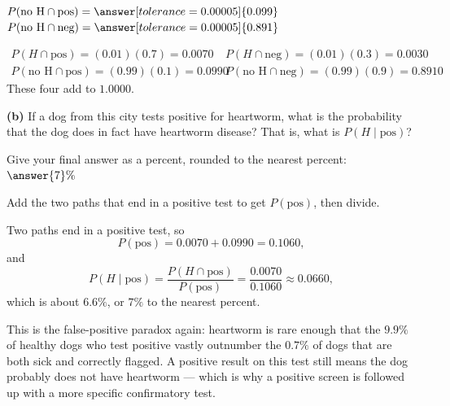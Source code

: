 \documentclass[12pt]{ximera}
\begin{document}
\begin{problem}
\begin{prompt}
\smallskip
$P(\text{no H}\cap\text{pos})=\answer[tolerance=0.00005]{0.099}$ \qquad
$P(\text{no H}\cap\text{neg})=\answer[tolerance=0.00005]{0.891}$

\begin{feedback}
\[
\begin{array}{ll}
P(H\cap\text{pos})=(0.01)(0.7)=0.0070 &
P(H\cap\text{neg})=(0.01)(0.3)=0.0030\\[2pt]
P(\text{no H}\cap\text{pos})=(0.99)(0.1)=0.0990 &
P(\text{no H}\cap\text{neg})=(0.99)(0.9)=0.8910
\end{array}
\]
These four add to $1.0000$. \checkmark
\end{feedback}
\end{prompt}

\begin{prompt}
\textbf{(b)} If a dog from this city tests positive for heartworm, what is the
probability that the dog does in fact have heartworm disease? That is, what is
$P(H\mid \text{pos})$?

Give your final answer as a percent, rounded to the nearest percent:
$\answer{7}\%$

\begin{hint}
Add the two paths that end in a positive test to get $P(\text{pos})$, then divide.
\end{hint}

\begin{feedback}
Two paths end in a positive test, so
\[
P(\text{pos}) = 0.0070 + 0.0990 = 0.1060,
\]
and
\[
P(H\mid\text{pos}) = \frac{P(H\cap\text{pos})}{P(\text{pos})}
= \frac{0.0070}{0.1060} \approx 0.0660,
\]
which is about $6.6\%$, or $7\%$ to the nearest percent.

This is the false-positive paradox again: heartworm is rare enough that the $9.9\%$
of healthy dogs who test positive vastly outnumber the $0.7\%$ of dogs that are both
sick and correctly flagged. A positive result on this test still means the dog
probably does not have heartworm --- which is why a positive screen is followed up
with a more specific confirmatory test.
\end{feedback}
\end{prompt}
\end{problem}
\end{document}
